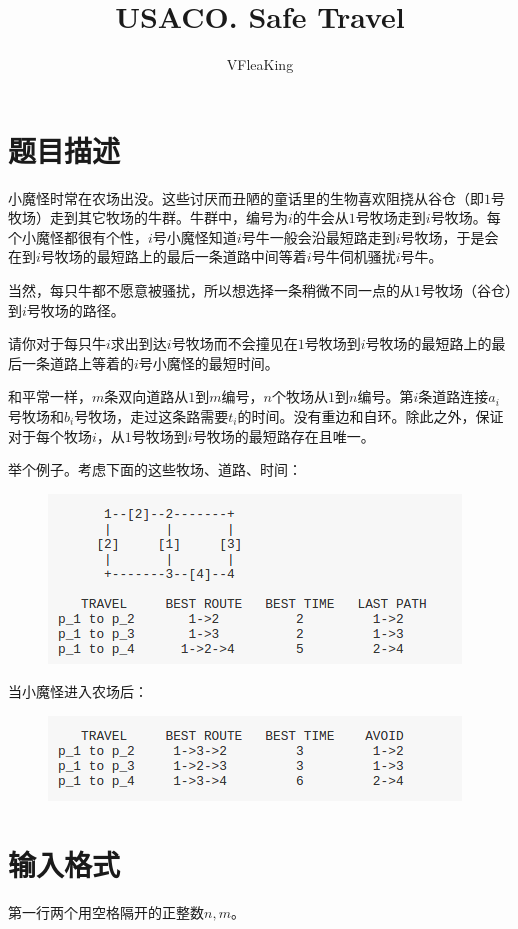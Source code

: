 \documentclass[11pt, a4paper]{article}
\title{USACO. Safe Travel}
\author{VFleaKing}
\begin{document}
\maketitle

\section*{题目描述}
小魔怪时常在农场出没。这些讨厌而丑陋的童话里的生物喜欢阻挠从谷仓（即$1$号牧场）走到其它牧场的牛群。牛群中，编号为$i$的牛会从$1$号牧场走到$i$号牧场。每个小魔怪都很有个性，$i$号小魔怪知道$i$号牛一般会沿最短路走到$i$号牧场，于是会在到$i$号牧场的最短路上的最后一条道路中间等着$i$号牛伺机骚扰$i$号牛。

当然，每只牛都不愿意被骚扰，所以想选择一条稍微不同一点的从$1$号牧场（谷仓）到$i$号牧场的路径。

请你对于每只牛$i$求出到达$i$号牧场而不会撞见在$1$号牧场到$i$号牧场的最短路上的最后一条道路上等着的$i$号小魔怪的最短时间。

和平常一样，$m$条双向道路从$1$到$m$编号，$n$个牧场从$1$到$n$编号。第$i$条道路连接$a_i$号牧场和$b_i$号牧场，走过这条路需要$t_i$的时间。没有重边和自环。除此之外，保证对于每个牧场$i$，从$1$号牧场到$i$号牧场的最短路存在且唯一。

举个例子。考虑下面的这些牧场、道路、时间：

\begin{figure}[h]
\centering
\includegraphics[scale=0.5]{a.png}
\end{figure}

当小魔怪进入农场后：

\begin{figure}[h]
\centering
\includegraphics[scale=0.5]{b.png}
\end{figure}

\section*{输入格式}
第一行两个用空格隔开的正整数$n, m$。
\end{document}
